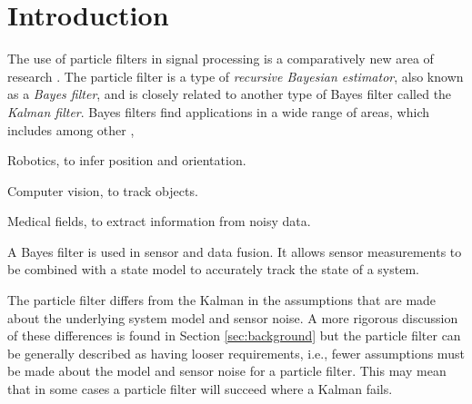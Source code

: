\section{Introduction}
The use of particle filters in signal processing is a comparatively new area of
research \cite{ref:1}. The particle filter is a type of \emph{recursive Bayesian estimator},
also known as a \emph{Bayes filter}, and is closely related to another type
of Bayes filter called the \emph{Kalman filter}. Bayes filters find
applications in a wide range of areas, which includes among other \cite{ref:2},
\begin{compactitem}
\item Robotics, to infer position and orientation.
\item Computer vision, to track objects.
\item Medical fields, to extract information from noisy data.
\end{compactitem}
A Bayes filter is used in sensor and data fusion. It allows sensor measurements
to be combined with a state model to accurately track the state of a system.

The particle filter differs from the Kalman in the assumptions that are made
about the underlying system model and sensor noise. A more rigorous discussion
of these differences is found in Section \ref{sec:background} but the particle filter
can be generally described as having looser requirements, i.e., fewer
assumptions must be made about the model and sensor noise for a particle filter.
This may mean that in some cases a particle filter will succeed where a Kalman fails.